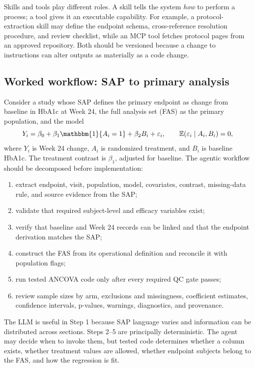 \documentclass[12pt,oneside]{book}
\numberwithin{equation}{section}
\theoremstyle{definition}
\theoremstyle{plain}
\theoremstyle{remark}
\newcommand{\E}{\mathbb{E}}
\newcommand{\ind}{\mathbbm{1}}
\begin{document}
Skills and tools play different roles.  A skill tells the system \emph{how} to
perform a process; a tool gives it an executable capability.  For example, a
protocol-extraction skill may define the endpoint schema, cross-reference
resolution procedure, and review checklist, while an MCP tool fetches protocol
pages from an approved repository.  Both should be versioned because a change
to instructions can alter outputs as materially as a code change.

\subsection{Worked workflow: SAP to primary analysis}

Consider a study whose SAP defines the primary endpoint as change from baseline
in HbA1c at Week 24, the full analysis set (FAS) as the primary population, and
the model
\begin{equation}
 Y_i=\beta_0+\beta_1\ind\{A_i=1\}+\beta_2B_i+\varepsilon_i,
 \qquad \E(\varepsilon_i\mid A_i,B_i)=0,
 \label{eq:ancova-agent-example}
\end{equation}
where $Y_i$ is Week 24 change, $A_i$ is randomized treatment, and $B_i$ is
baseline HbA1c.  The treatment contrast is $\beta_1$, adjusted for baseline.
The agentic workflow should be decomposed before implementation:
\begin{enumerate}
    \item extract endpoint, visit, population, model, covariates, contrast,
    missing-data rule, and source evidence from the SAP;
    \item validate that required subject-level and efficacy variables exist;
    \item verify that baseline and Week 24 records can be linked and that the
    endpoint derivation matches the SAP;
    \item construct the FAS from its operational definition and reconcile it
    with population flags;
    \item run tested ANCOVA code only after every required QC gate passes;
    \item review sample sizes by arm, exclusions and missingness, coefficient
    estimates, confidence intervals, p-values, warnings, diagnostics, and
    provenance.
\end{enumerate}

The LLM is useful in Step 1 because SAP language varies and information can be
distributed across sections.  Steps 2--5 are principally deterministic.  The
agent may decide when to invoke them, but tested code determines whether a
column exists, whether treatment values are allowed, whether endpoint subjects
belong to the FAS, and how the regression is fit.
\end{document}
